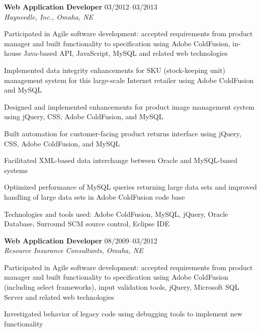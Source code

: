 \begin{itemize1}
	\item \textbf{Web Application Developer} \textopenbullet{} 03/2012--03/2013 \\
		\textit{Hayneedle, Inc., Omaha, NE} \vspace{-1.5mm}
		\begin{itemize1}
			\item Participated in Agile software development: accepted requirements from product manager and built functionality to specification using Adobe ColdFusion, in-house Java-based API, JavaScript, MySQL and related web technologies
			\item Implemented data integrity enhancements for SKU (stock-keeping unit) management system for this large-scale Internet retailer using Adobe ColdFusion and MySQL
			\item Designed and implemented enhancements for product image management system using jQuery, CSS, Adobe ColdFusion, and MySQL
			\item Built automation for customer-facing product returns interface using jQuery, CSS, Adobe ColdFusion, and MySQL
			\item Facilitated XML-based data interchange between Oracle and MySQL-based systems
			\item Optimized performance of MySQL queries returning large data sets and improved handling of large data sets in Adobe ColdFusion code base
			\item Technologies and tools used: Adobe ColdFusion, MySQL, jQuery, Oracle Database, Surround SCM source control, Eclipse IDE
		\end{itemize1}
	\item \textbf{Web Application Developer} \textopenbullet{} 08/2009--03/2012 \\
		\textit{Resource Insurance Consultants, Omaha, NE} \vspace{-1.5mm}
		\begin{itemize1}
 			\item Participated in Agile software development: accepted requirements from product manager and built functionality to specification using Adobe ColdFusion (including select frameworks), input validation tools, jQuery, Microsoft SQL Server and related web technologies
 			\item Investigated behavior of legacy code using debugging tools to implement new functionality	

\end{itemize1}
\end{itemize1}
